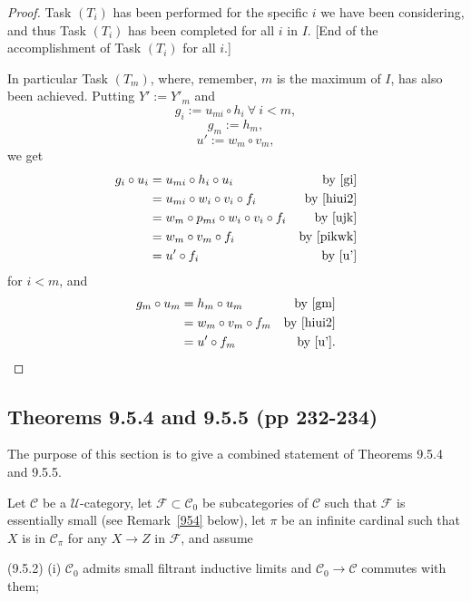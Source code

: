 \documentclass[12pt]{article}
\theoremstyle{remark}
\theoremstyle{definition}
\newcommand{\nn}{\noindent}
\newcommand{\cc}{\mathcal}
\newcommand{\C}{\mathcal C}
\newcommand{\U}{\mathcal U}
\begin{document}
\begin{proof}
Task $(T_i)$ has been performed for the specific $i$ we have been considering, and thus Task $(T_i)$ has been completed for all $i$ in $I$. [End of the accomplishment of Task $(T_i)$ for all $i$.]

In particular Task $(T_m)$, where, remember, $m$ is the maximum of $I$, has also been achieved. Putting $Y':=Y'_m$ and 
%
\begin{equation}\label{gi}
g_i:=u_{mi}\circ h_i\ \forall\ i<m,
\end{equation}
%
\begin{equation}\label{gm}
g_m:=h_m,
\end{equation}
%
\begin{equation}\label{u'}
u':=w_m\circ v_m,
\end{equation}
%
we get
% 
\begin{align*}
g_i\circ u_i&=u_{mi}\circ h_i\circ u_i&\text{by \eqref{gi}}\\ 
&=u_{mi}\circ w_i\circ v_i\circ f_i&\text{by \eqref{hiui2}}\\ 
&=w_m\circ p_{mi}\circ w_i\circ v_i\circ f_i&\text{by \eqref{ujk}}\\ 
&=w_m\circ v_m\circ f_i&\text{by \eqref{pikwk}}\\ 
&=u'\circ f_i&\text{by \eqref{u'}}
\end{align*}
%
for $i<m$, and 
% 
\begin{align*}
g_m\circ u_m&=h_m\circ u_m&\text{by \eqref{gm}}\\ 
&=w_m\circ v_m\circ f_m&\text{by \eqref{hiui2}}\\ 
&=u'\circ f_m&\text{by \eqref{u'}}.
\end{align*}
%
\end{proof}


\subsection{Theorems 9.5.4 and 9.5.5 (pp 232-234)}\label{954955}

The purpose of this section is to give a combined statement of Theorems 9.5.4 and 9.5.5. 

Let $\C$ be a $\U$-category, let $\cc F\subset\C_0$ be subcategories of $\C$ such that $\cc F$ is essentially small (see Remark~\ref{954} below), let $\pi$ be an infinite cardinal such that $X$ is in $\C_\pi$ for any $X\to Z$ in $\cc F$, and assume 

\nn(9.5.2) (i) $\C_0$ admits small filtrant inductive limits and $\C_0\to\C$ commutes with them;
\end{document}
